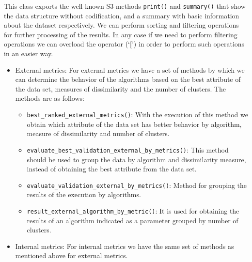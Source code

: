 \documentclass[
]{article}
\providecommand{\tightlist}{%
  \setlength{\itemsep}{0pt}\setlength{\parskip}{0pt}}
\begin{document}
This class exports the well-known S3 methods \texttt{print()} and
\texttt{summary()} that show the data structure without codification,
and a summary with basic information about the dataset respectively. We
can perform sorting and filtering operations for further processing of
the results. In any case if we need to perform filtering operations we
can overload the operator (`{[}') in order to perform such operations in
an easier way.

\begin{itemize}
\tightlist
\item
  External metrics: For external metrics we have a set of methods by
  which we can determine the behavior of the algorithms based on the
  best attribute of the data set, measures of dissimilarity and the
  number of clusters. The methods are as follows:

  \begin{itemize}
  \tightlist
  \item
    \texttt{best\_ranked\_external\_metrics()}: With the execution of
    this method we obtain which attribute of the data set has better
    behavior by algorithm, measure of dissimilarity and number of
    clusters.
  \item
    \texttt{evaluate\_best\_validation\_external\_by\_metrics()}: This
    method should be used to group the data by algorithm and
    dissimilarity measure, instead of obtaining the best attribute from
    the data set.
  \item
    \texttt{evaluate\_validation\_external\_by\_metrics()}: Method for
    grouping the results of the execution by algorithms.
  \item
    \texttt{result\_external\_algorithm\_by\_metric()}: It is used for
    obtaining the results of an algorithm indicated as a parameter
    grouped by number of clusters.
  \end{itemize}
\item
  Internal metrics: For internal metrics we have the same set of methods
  as mentioned above for external metrics.


\end{itemize}
\end{document}
